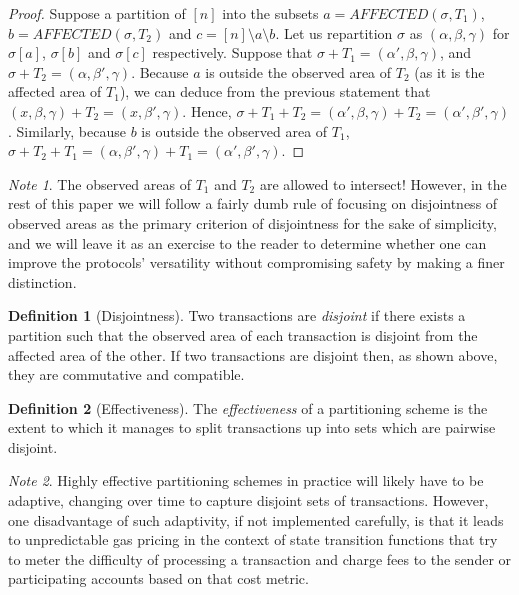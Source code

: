 \documentclass[11pt,a4paper]{report}
\theoremstyle{plain}
\theoremstyle{definition}
\newtheorem{defn}{Definition}[chapter]
\theoremstyle{remark}
\newtheorem*{note}{Note}
\begin{document}
\begin{proof}
Suppose a partition of $[n]$ into the subsets $a = AFFECTED(\sigma, T_1)$, $b = AFFECTED(\sigma, T_2)$ and $c = [n] \setminus a \setminus b$. Let us repartition $\sigma$ as $(\alpha, \beta, \gamma)$ for $\sigma[a]$, $\sigma[b]$ and $\sigma[c]$ respectively. Suppose that $\sigma + T_1 = (\alpha', \beta, \gamma)$, and $\sigma + T_2 = (\alpha, \beta', \gamma)$. Because $a$ is outside the observed area of $T_2$ (as it is the affected area of $T_1$), we can deduce from the previous statement that $(x, \beta, \gamma) + T_2 = (x, \beta', \gamma)$. Hence, $\sigma + T_1 + T_2 = (\alpha', \beta, \gamma) + T_2 = (\alpha', \beta', \gamma)$. Similarly, because $b$ is outside the observed area of $T_1$, $\sigma + T_2 + T_1 = (\alpha, \beta', \gamma) + T_1 = (\alpha', \beta', \gamma)$.
\end{proof}

\begin{note}
The observed areas of $T_1$ and $T_2$ are allowed to intersect! However, in the rest of this paper we will follow a fairly dumb rule of focusing on disjointness of observed areas as the primary criterion of disjointness for the sake of simplicity, and we will leave it as an exercise to the reader to determine whether one can improve the protocols' versatility without compromising safety by making a finer distinction.
\end{note}

\begin{defn}[Disjointness]
Two transactions are \emph{disjoint} if there exists a partition such that the observed area of each transaction is disjoint from the affected area of the other. If two transactions are disjoint then, as shown above, they are commutative and compatible.
\end{defn}

\begin{defn}[Effectiveness]
The \emph{effectiveness} of a partitioning scheme is the extent to which it manages to split transactions up into sets which are pairwise disjoint.
\end{defn}

\begin{note}
Highly effective partitioning schemes in practice will likely have to be adaptive, changing over time to capture disjoint sets of transactions. However, one disadvantage of such adaptivity, if not implemented carefully, is that it leads to unpredictable gas pricing in the context of state transition functions that try to meter the difficulty of processing a transaction and charge fees to the sender or participating accounts based on that cost metric.
\end{note}
\end{document}

